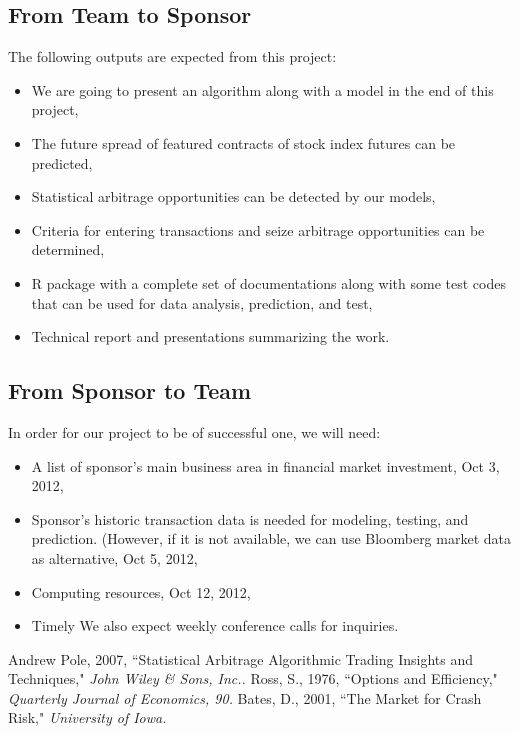 \documentclass[12pt,letterpaper]{article}
\theoremstyle{definition}
\begin{document}
\subsection{From Team to Sponsor} %
The following outputs are expected from this project:
\begin{itemize}
   \item We are going to present an algorithm along with a model in the end of this project,
     \item The future spread of featured contracts of stock index futures can be predicted, 
    \item Statistical arbitrage opportunities can be detected by our models,
    \item Criteria for entering transactions and seize arbitrage opportunities can be determined,
    \item	R package with a complete set of documentations along with some test codes that can be used for data analysis, prediction, and test,
    \item Technical report and presentations summarizing the work.
\end{itemize}

\subsection{From Sponsor to Team} %

In order for our project to be of successful one, we will need:
\begin{itemize}
    \item A list of sponsor's main business area in financial market investment, Oct 3, 2012,
    \item Sponsor's historic transaction data is needed for modeling, testing, and prediction. (However, if it is not available, we can use Bloomberg market data as alternative, Oct 5, 2012,
    \item Computing resources, Oct 12, 2012,
    \item Timely We also expect weekly conference calls for inquiries.


\end{itemize}


\begin{thebibliography}{4}  
\bibitem{} Andrew Pole, 2007, ``Statistical Arbitrage Algorithmic Trading Insights and Techniques," \emph{John Wiley \& Sons, Inc..} 
\bibitem{}  Ross, S., 1976, ``Options and Efficiency," \emph{Quarterly Journal of Economics, 90.}
\bibitem{}  Bates, D., 2001, ``The Market for Crash Risk," \emph{University of Iowa.}
\end{thebibliography}
\end{document}
